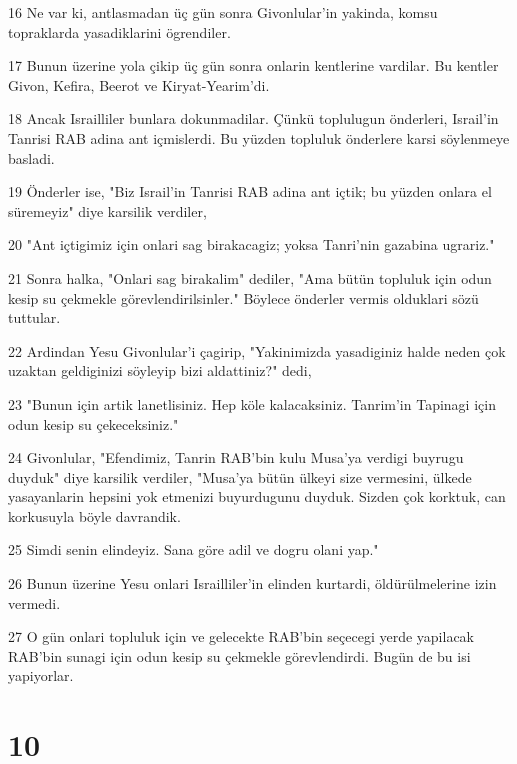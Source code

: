 \par 16 Ne var ki, antlasmadan üç gün sonra Givonlular'in yakinda, komsu topraklarda yasadiklarini ögrendiler.
\par 17 Bunun üzerine yola çikip üç gün sonra onlarin kentlerine vardilar. Bu kentler Givon, Kefira, Beerot ve Kiryat-Yearim'di.
\par 18 Ancak Israilliler bunlara dokunmadilar. Çünkü toplulugun önderleri, Israil'in Tanrisi RAB adina ant içmislerdi. Bu yüzden topluluk önderlere karsi söylenmeye basladi.
\par 19 Önderler ise, "Biz Israil'in Tanrisi RAB adina ant içtik; bu yüzden onlara el süremeyiz" diye karsilik verdiler,
\par 20 "Ant içtigimiz için onlari sag birakacagiz; yoksa Tanri'nin gazabina ugrariz."
\par 21 Sonra halka, "Onlari sag birakalim" dediler, "Ama bütün topluluk için odun kesip su çekmekle görevlendirilsinler." Böylece önderler vermis olduklari sözü tuttular.
\par 22 Ardindan Yesu Givonlular'i çagirip, "Yakinimizda yasadiginiz halde neden çok uzaktan geldiginizi söyleyip bizi aldattiniz?" dedi,
\par 23 "Bunun için artik lanetlisiniz. Hep köle kalacaksiniz. Tanrim'in Tapinagi için odun kesip su çekeceksiniz."
\par 24 Givonlular, "Efendimiz, Tanrin RAB'bin kulu Musa'ya verdigi buyrugu duyduk" diye karsilik verdiler, "Musa'ya bütün ülkeyi size vermesini, ülkede yasayanlarin hepsini yok etmenizi buyurdugunu duyduk. Sizden çok korktuk, can korkusuyla böyle davrandik.
\par 25 Simdi senin elindeyiz. Sana göre adil ve dogru olani yap."
\par 26 Bunun üzerine Yesu onlari Israilliler'in elinden kurtardi, öldürülmelerine izin vermedi.
\par 27 O gün onlari topluluk için ve gelecekte RAB'bin seçecegi yerde yapilacak RAB'bin sunagi için odun kesip su çekmekle görevlendirdi. Bugün de bu isi yapiyorlar.

\chapter{10}

